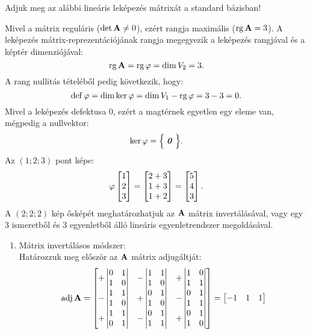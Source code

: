 \begin{exercise}{%
    Adjuk meg az alábbi lineáris leképezés mátrixát a standard bázisban!
  }
{    Mivel a mátrix reguláris ($\det \mathbf{A} \neq 0$), ezért rangja maximális
    ($\operatorname{rg} \mathbf{A} = 3$). A leképezés mátrix-reprezentációjának rangja megegyezik
    a leképezés rangjával és a képtér dimenziójával:
    \[
      \operatorname{rg} \mathbf{A} = \operatorname{rg} \varphi = \operatorname{dim} V_2 = 3
      \text.
    \]
    A rang nullitás tételéből pedig következik, hogy:
    \[
      \operatorname{def} \varphi = \operatorname{dim} \ker \varphi = \operatorname{dim} V_1 - \operatorname{rg} \varphi = 3 - 3 = 0
      \text.
    \]
    Mivel a leképezés defektusa 0, ezért a magtérnek egyetlen egy eleme van,
    mégpedig a nullvektor:
    \[
      \ker \varphi = \Big\{\; \text{\textbf{\textit{0}}} \;\Big\}
      \text.
    \]
    Az $(1;2;3)$ pont képe:
    \[
      \varphi \begin{bmatrix}
        1 \\ 2 \\ 3
      \end{bmatrix} = \begin{bmatrix}
        2 + 3 \\
        1 + 3 \\
        1 + 2
      \end{bmatrix} = \begin{bmatrix}
        5 \\ 4 \\3
      \end{bmatrix}
      \text.
    \]
    A $(2;2;2)$ kép ősképét meghatározhatjuk az $\mathbf{A}$ mátrix invertálásával,
    vagy egy 3 ismeretből és 3 egyenletből álló lineáris egyenletrendszer
    megoldásával.
    \begin{enumerate}
      \newcommand\qadj[4]{\begin{vmatrix}#1&#2\\#3&#4\end{vmatrix}}
      \item Mátrix invertálásos módszer: \\[2mm]
            Határozzuk meg először az $\mathbf{A}$ mátrix adjugáltját:
            \[
              \adj \rmat A = \begin{bmatrix}
                +\qadj{0}{1}{1}{0} & -\qadj{1}{1}{1}{0} & +\qadj{1}{0}{1}{1} \\
                -\qadj{1}{1}{1}{0} & +\qadj{0}{1}{1}{0} & -\qadj{0}{1}{1}{1} \\
                +\qadj{1}{1}{0}{1} & -\qadj{0}{1}{1}{1} & +\qadj{0}{1}{1}{0} \\
              \end{bmatrix} = \begin{bmatrix}
                -1 & 1  & 1  \\

\end{bmatrix}\]
\end{enumerate}}
\end{exercise}
